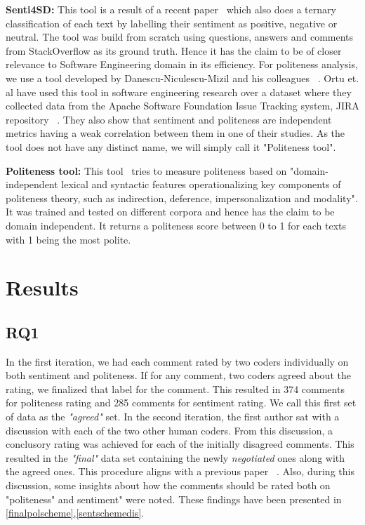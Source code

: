 \newline
\indent\textbf{Senti4SD:} This tool is a result of a recent paper~\cite{calefato2017sentiment} which also does a ternary classification of each text by labelling their sentiment as positive, negative or neutral. The tool was build from scratch using questions, answers and comments from StackOverflow as its ground truth. Hence it has the claim to be of closer relevance to Software Engineering domain in its efficiency.
\newline
\newline
For politeness analysis, we use a tool developed by Danescu-Niculescu-Mizil and his colleagues ~\cite{danescu2013computational}. Ortu et. al have used this tool in software engineering research over a dataset where they collected data from the Apache Software Foundation Issue Tracking system, JIRA repository ~\cite{ortu2015would,ortu2015bullies}. They also show that sentiment and politeness are independent metrics having a weak correlation between them in one of their studies. As the tool does not have any distinct name, we will simply call it "Politeness tool". 

\textbf{Politeness tool:} This tool~\cite{danescu2013computational} tries to measure politeness based on "domain-independent lexical and syntactic features operationalizing key components of politeness theory, such as indirection, deference, impersonalization and modality". It was trained and tested on different corpora and hence has the claim to be domain independent. It returns a politeness score between 0 to 1 for each texts with 1 being the most polite.  

 
\section{Results}

\subsection{RQ1 }\label{gt}

In the first iteration, we had each comment rated by two coders individually on both sentiment and politeness. If for any comment, two coders agreed about the rating, we finalized that label for the comment. This resulted in 374 comments for politeness rating and 285 comments for sentiment rating. We call this first set of data as the \textit{"agreed"} set.
In the second iteration, the first author sat with a discussion with each of the two other human coders. From this discussion, a conclusory rating was achieved for each of the initially disagreed comments. This resulted in the \textit{"final" }data set containing the newly \textit{negotiated} ones along with the agreed ones. This procedure aligns with a previous paper ~\cite{ahmed2017senticr}. Also, during this discussion, some insights about how the comments should be rated both on "politeness" and sentiment" were noted. These findings have been presented in \ref{finalpolscheme},\ref{sentschemedis}.

